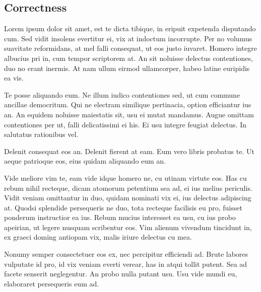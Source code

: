 \documentclass[10pt, letterpapper]{proc}
\begin{document}
\subsection{Correctness}
Lorem ipsum dolor sit amet, est te dicta tibique, in eripuit expetenda disputando cum. Sed vidit insolens evertitur ei, vix at indoctum incorrupte. Per no volumus suavitate reformidans, at mel falli consequat, ut eos justo iuvaret. Homero integre albucius pri in, cum tempor scriptorem at. An sit noluisse delectus contentiones, duo no erant inermis. At nam ullum eirmod ullamcorper, habeo latine euripidis ea vis.

Te posse aliquando eum. Ne illum iudico contentiones sed, ut cum commune ancillae democritum. Qui ne electram similique pertinacia, option efficiantur ius an. An equidem noluisse maiestatis sit, usu ei mutat mandamus. Augue omittam contentiones per ut, falli delicatissimi ei his. Ei usu integre feugiat delectus. In salutatus rationibus vel.

Delenit consequat eos an. Delenit fierent at eam. Eum vero libris probatus te. Ut aeque patrioque eos, eius quidam aliquando eum an.

Vide meliore vim te, eam vide idque homero ne, cu utinam virtute eos. Has cu rebum nihil recteque, dicam atomorum petentium sea ad, ei ius melius periculis. Vidit veniam omittantur in duo, quidam nominati vix ei, ius delectus adipiscing at. Quodsi splendide persequeris ne duo, tota recteque facilisis eu pro, fuisset ponderum instructior ea ius. Rebum mucius interesset ea usu, cu ius probo apeirian, ut legere nusquam scribentur eos. Vim alienum vivendum tincidunt in, ex graeci doming antiopam vix, malis iriure delectus cu mea.

Nonumy semper consectetuer eos ex, nec percipitur efficiendi ad. Brute labores vulputate id pro, id vix veniam everti verear, has in atqui tollit putent. Sea ad facete senserit neglegentur. An probo nulla putant usu. Usu vide mundi eu, elaboraret persequeris eum ad.
\end{document}
